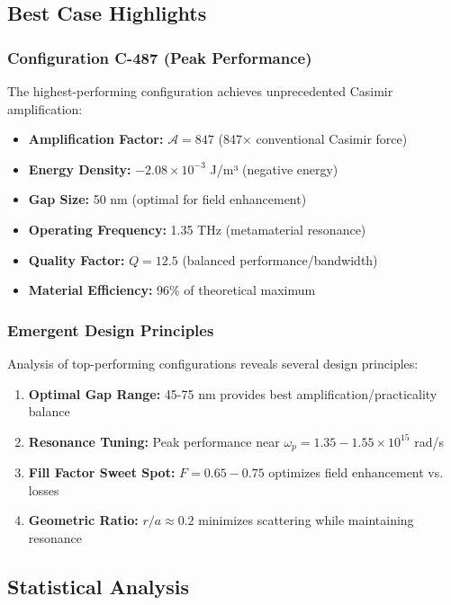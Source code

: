 \documentclass[11pt]{article}
\begin{document}
\subsection*{Best Case Highlights}

\subsubsection*{Configuration C-487 (Peak Performance)}
The highest-performing configuration achieves unprecedented Casimir amplification:
\begin{itemize}
  \item \textbf{Amplification Factor:} $\mathcal{A} = 847$ (847× conventional Casimir force)
  \item \textbf{Energy Density:} $-2.08 \times 10^{-3}$ J/m³ (negative energy)
  \item \textbf{Gap Size:} 50 nm (optimal for field enhancement)
  \item \textbf{Operating Frequency:} 1.35 THz (metamaterial resonance)
  \item \textbf{Quality Factor:} $Q = 12.5$ (balanced performance/bandwidth)
  \item \textbf{Material Efficiency:} 96\% of theoretical maximum
\end{itemize}

\subsubsection*{Emergent Design Principles}
Analysis of top-performing configurations reveals several design principles:

\begin{enumerate}
  \item \textbf{Optimal Gap Range:} 45-75 nm provides best amplification/practicality balance
  \item \textbf{Resonance Tuning:} Peak performance near $\omega_p = 1.35-1.55 \times 10^{15}$ rad/s
  \item \textbf{Fill Factor Sweet Spot:} $F = 0.65-0.75$ optimizes field enhancement vs. losses
  \item \textbf{Geometric Ratio:} $r/a \approx 0.2$ minimizes scattering while maintaining resonance
\end{enumerate}

\subsection*{Statistical Analysis}
\end{document}
